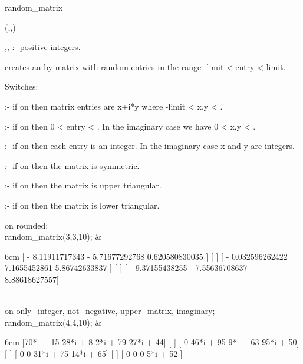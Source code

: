 \begin{Operator}{random_matrix}

\begin{Syntax}
(,,)
\end{Syntax}
 
,, :- positive integers. 

 creates an  by  matrix with random
entries in the range -limit < entry < limit.


Switches:

    :- if on then matrix entries are x+i*y where -limit < x,y
                 < . 

 :- if on then 0 < entry < . In the imaginary 
                 case we have 0 < x,y < . 

 :- if on then each entry is an integer. In the imaginary 
		 case x and y are integers.

     :- if on then the matrix is symmetric. 

 :- if on then the matrix is upper triangular.

 :- if on then the matrix is lower triangular.



\begin{Examples}

on rounded; \\
random_matrix(3,3,10); &
\begin{multilineoutput}{6cm}
[ - 8.11911717343    - 5.71677292768   0.620580830035 ]
[                                                     ]
[ - 0.032596262422    7.1655452861     5.86742633837  ]
[                                                     ]
[ - 9.37155438255    - 7.55636708637   - 8.88618627557]
\end{multilineoutput}\\

on only_integer, not_negative, upper_matrix, imaginary; \\
random_matrix(4,4,10); &
\begin{multilineoutput}{6cm}
[70*i + 15  28*i + 8   2*i + 79   27*i + 44]
[                                          ]
[    0      46*i + 95  9*i + 63   95*i + 50]
[                                          ]
[    0          0      31*i + 75  14*i + 65]
[                                          ]
[    0          0          0      5*i + 52 ]
\end{multilineoutput}\\

\end{Examples}

\end{Operator}


